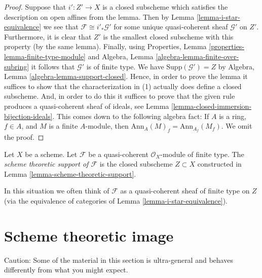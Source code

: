 \begin{proof}
Suppose that $i' : Z' \to X$ is a closed subscheme which satisfies the
description on open affines from the lemma. Then by
Lemma \ref{lemma-i-star-equivalence}
we see that $\mathcal{F} \cong i'_*\mathcal{G}'$ for some unique
quasi-coherent sheaf $\mathcal{G}'$ on $Z'$. Furthermore, it is clear
that $Z'$ is the smallest closed subscheme with this property (by the
same lemma). Finally, using
Properties, Lemma \ref{properties-lemma-finite-type-module}
and
Algebra, Lemma \ref{algebra-lemma-finite-over-subring}
it follows that $\mathcal{G}'$ is of finite type. We have
$\text{Supp}(\mathcal{G}') = Z$ by
Algebra, Lemma \ref{algebra-lemma-support-closed}.
Hence, in order to prove the lemma it suffices to show that
the characterization in (1) actually does define a closed subscheme.
And, in order to do this it suffices to prove that the given rule
produces a quasi-coherent sheaf of ideals, see
Lemma \ref{lemma-closed-immersion-bijection-ideals}.
This comes down to the following algebra fact: If $A$ is a ring, $f \in A$,
and $M$ is a finite $A$-module, then
$\text{Ann}_A(M)_f = \text{Ann}_{A_f}(M_f)$.
We omit the proof.
\end{proof}

\begin{definition}
\label{definition-scheme-theoretic-support}
Let $X$ be a scheme. Let $\mathcal{F}$ be a quasi-coherent
$\mathcal{O}_X$-module of finite type. The {\it scheme theoretic support
of $\mathcal{F}$} is the closed subscheme $Z \subset X$ constructed in
Lemma \ref{lemma-scheme-theoretic-support}.
\end{definition}

\noindent
In this situation we often think of $\mathcal{F}$ as a quasi-coherent
sheaf of finite type on $Z$ (via the equivalence of categories of
Lemma \ref{lemma-i-star-equivalence}).













\section{Scheme theoretic image}
\label{section-scheme-theoretic-image}

\noindent
Caution: Some of the material in this section is ultra-general and
behaves differently from what you might expect.

